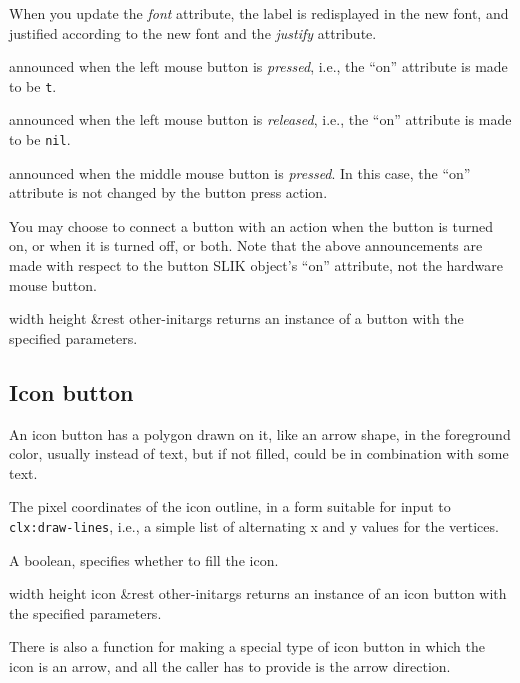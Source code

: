 \documentclass[twoside,openright,11pt]{report}
\newcommand{\tp}[1]{\texttt{#1}}
\begin{document}
When you update the \emph{font} attribute, the label is redisplayed in
the new font, and justified according to the new font and the
\emph{justify} attribute.


{announced when the left mouse button is \emph{pressed}, i.e., the
``on'' attribute is made to be \tp{t}.}

{announced when the left mouse button is \emph{released}, i.e., the
``on'' attribute is made to be \tp{nil}.}

{announced when the middle mouse button is \emph{pressed}.  In this
case, the ``on'' attribute is not changed by the button press action.}

You may choose to connect a button with an action when the button is
turned on, or when it is turned off, or both.  Note that the above
announcements are made with respect to the button SLIK object's ``on''
attribute, not the hardware mouse button.


{width height \&rest other-initargs}
{returns an instance of a button with the specified parameters.}

\subsection{Icon button}

An icon button has a polygon drawn on it, like an arrow shape, in the
foreground color, usually instead of text, but if not filled, could be
in combination with some text.  


{The pixel coordinates of the icon outline, in a form suitable for
input to \tp{clx:draw-lines}, i.e., a simple list of alternating x
and y values for the vertices.}

{A boolean, specifies whether to fill the icon.}


{width height icon \&rest other-initargs}
{returns an instance of an icon button with the specified parameters.}

There is also a function for making a special type of icon button in
which the icon is an arrow, and all the caller has to provide is the
arrow direction.
\end{document}
